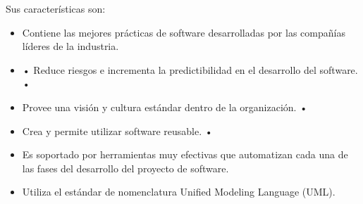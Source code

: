 Sus características son:

\begin{itemize}
    \item Contiene las mejores prácticas de software desarrolladas por las compañías líderes de la industria.
    \item• Reduce riesgos e incrementa la predictibilidad en el desarrollo del software. • 
    \item Provee una visión y cultura estándar dentro de la organización. • 
    \item Crea y permite utilizar software reusable. • 
    \item Es soportado por herramientas muy efectivas que automatizan cada una de las fases del desarrollo del proyecto de software.
    \item Utiliza el estándar de nomenclatura Unified Modeling Language (UML).
\end{itemize}

